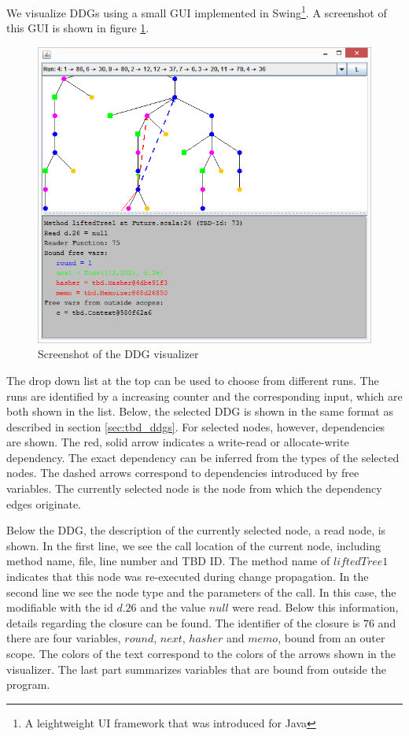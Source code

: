 We visualize DDGs using a small GUI implemented in Swing\footnote{A leightweight UI framework that was introduced for Java}. A screenshot of this GUI is shown in figure \ref{fig:ddg_vis_ui}. 

\begin{figure}
\begin{center}
\includegraphics[scale=0.7]{screens/DDGVis.png}
\end{center}
\caption{Screenshot of the DDG visualizer}
\label{fig:ddg_vis_ui}
\end{figure}

The drop down list at the top can be used to choose from different runs. The runs are identified by a increasing counter and the corresponding input, which are both shown in the list. Below, the selected DDG is shown in the same format as described in section \ref{sec:tbd_ddgs}. For selected nodes, however, dependencies are shown. The red, solid arrow indicates a write-read or allocate-write dependency. The exact dependency can be inferred from the types of the selected nodes. The dashed arrows correspond to dependencies introduced by free variables. The currently selected node is the node from which the dependency edges originate. 

Below the DDG, the description of the currently selected node, a read node, is shown. In the first line, we see the call location of the current node, including method name, file, line number and TBD ID. The method name of $liftedTree1$ indicates that this node was re-executed during change propagation. In the second line we see the node type and the parameters of the call. In this case, the modifiable with the id $d.26$ and the value $null$ were read. Below this information, details regarding the closure can be found. The identifier of the closure is $76$ and there are four variables, $round$, $next$, $hasher$ and $memo$, bound from an outer scope. The colors of the text correspond to the colors of the arrows shown in the visualizer. The last part summarizes variables that are bound from outside the program.  

